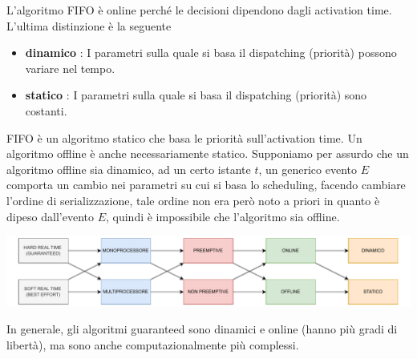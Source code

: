 \documentclass[10pt, letterpaper]{report}
\begin{document}
L'algoritmo FIFO è online perché le decisioni dipendono dagli activation time. L'ultima distinzione 
è la seguente\begin{itemize}
    \item \textbf{dinamico} :  I parametri sulla quale si basa il dispatching (priorità) possono 
    variare nel tempo.
    \item \textbf{statico} : I parametri sulla quale si basa il dispatching (priorità) sono costanti.
\end{itemize}
FIFO è un algoritmo statico che basa le priorità sull'activation time.\acc 
\prop{}  Un algoritmo offline è anche necessariamente statico. \acc
\dimo{}  Supponiamo per assurdo che un algoritmo offline sia dinamico, ad un certo istante 
$t$, un generico evento $E$ comporta un cambio nei parametri su cui si basa lo scheduling, 
facendo cambiare l'ordine di serializzazione, tale ordine non era però noto a priori in quanto è 
dipeso dall'evento $E$, quindi è impossibile che l'algoritmo sia offline.\begin{center}
    \includegraphics[width=1\textwidth ]{images/diagrammaSinottico.pdf}
\end{center}
In generale, gli algoritmi guaranteed sono dinamici e online (hanno più gradi di libertà), ma sono anche 
computazionalmente più  complessi.
\end{document}
